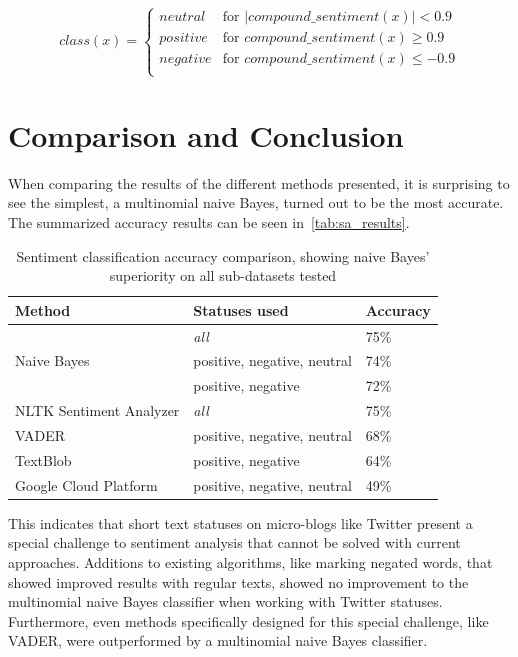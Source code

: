 \begin{equation}
    class(x) =
    \begin{cases}
        neutral & \text{for } |compound\_sentiment(x)| < 0.9 \\
        positive & \text{for } compound\_sentiment(x) \geq 0.9 \\
        negative & \text{for } compound\_sentiment(x) \leq -0.9 \\
    \end{cases}
\end{equation}

\section{Comparison and Conclusion}
\label{sec:comparison}

When comparing the results of the different methods presented, it is surprising to see the simplest,
a multinomial naive Bayes, turned out to be the most accurate.
The summarized accuracy results can be seen in~\autoref{tab:sa_results}.

\begin{table}
    \caption{Sentiment classification accuracy comparison, showing naive Bayes' superiority on all sub-datasets tested}
    \label{tab:sa_results}
    \centering
    \begin{tabular}{lll} %
        \toprule
        Method
        & Statuses used
        & Accuracy
        \\\midrule
        & \textit{all} & 75\%
        \\\cmidrule{2-3}
        Naive Bayes & positive, negative, neutral & 74\%
        \\\cmidrule{2-3}
        & positive, negative & 72\%
        \\\midrule
        NLTK Sentiment Analyzer & \textit{all} & 75\%
        \\\midrule
        VADER & positive, negative, neutral & 68\%
        \\\midrule
        TextBlob & positive, negative & 64\%
        \\\midrule
        Google Cloud Platform & positive, negative, neutral & 49\%
        \\\bottomrule
    \end{tabular}
\end{table}

This indicates that short text statuses on micro-blogs like Twitter present a special challenge to sentiment analysis
that cannot be solved with current approaches.
Additions to existing algorithms, like marking negated words, that showed improved results with regular texts,
showed no improvement to the multinomial naive Bayes classifier when working with Twitter statuses.
Furthermore, even methods specifically designed for this special challenge, like VADER,
were outperformed by a multinomial naive Bayes classifier.

